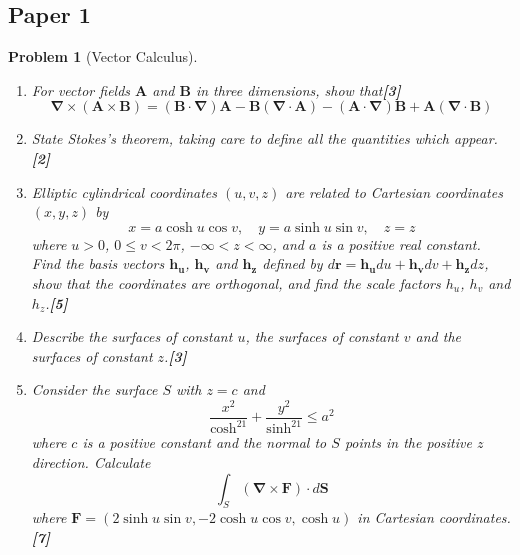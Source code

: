\documentclass[a4paper]{article}
\theoremstyle{new}
\newtheorem{qns}{Problem}[section]
\begin{document}
\subsection{Paper 1}
\begin{qns}[Vector Calculus]\leavevmode
\begin{enumerate}[label=(\alph*)]
    \item For vector fields $\mathbf{A}$ and $\mathbf{B}$ in three dimensions, show that\hfill\textbf{[3]}
$$\boldsymbol{\nabla}\times(\mathbf{A}\times\mathbf{B})=(\mathbf{B}\cdot\boldsymbol{\nabla})\mathbf{A}-\mathbf{B}(\boldsymbol{\nabla}\cdot\mathbf{A})-(\mathbf{A}\cdot\boldsymbol{\nabla})\mathbf{B}+\mathbf{A}(\boldsymbol{\nabla}\cdot\mathbf{B})$$
\item State Stokes’s theorem, taking care to define all the quantities which appear. \hfill\textbf{[2]}
\item Elliptic cylindrical coordinates $(u, v, z)$ are related to Cartesian coordinates $(x, y, z)$ by
$$x = a \cosh u \cos v,\quad y = a \sinh u \sin v,\quad z = z$$
where $u > 0$, $0\leq v<2\pi$, $-\infty<z<\infty$, and $a$ is a positive real constant. Find the basis vectors $\mathbf{h_u}$, $\mathbf{h_v}$ and $\mathbf{h_z}$ defined by $d\mathbf{r} = \mathbf{h_u} du + \mathbf{h_v} dv + \mathbf{h_z} dz$, show that the coordinates are orthogonal, and find the scale factors $h_u$, $h_v$ and $h_z$.\hfill\textbf{[5]}
\item Describe the surfaces of constant $u$, the surfaces of constant $v$ and the surfaces of constant $z$.\hfill\textbf{[3]}
\item Consider the surface $S$ with $z = c$ and
$$\frac{x^2}{\cosh^21}+\frac{y^2}{\sinh^21}\leq a^2$$
where $c$ is a positive constant and the normal to $S$ points in the positive $z$ direction. Calculate 
$$\int_S(\boldsymbol{\nabla}\times\mathbf{F})\cdot d\mathbf{S}$$
where $\mathbf{F} = (2 \sinh u \sin v,−2 \cosh u \cos v, \cosh u)$ in Cartesian coordinates. \hfill\textbf{[7]}
\end{enumerate}
\end{qns}
\end{document}
